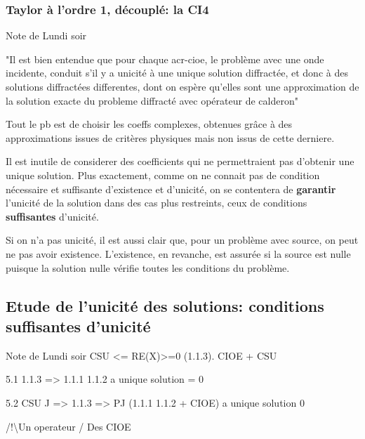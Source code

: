         \subsubsection{Taylor à l'ordre 1, découplé: la CI4}

        \begin{REM}
            Note de Lundi soir

            "Il est bien entendue que pour chaque \gls{acr-cioe}, le problème avec une onde incidente, conduit s'il y a unicité à une unique solution diffractée, et donc à des solutions diffractées differentes, dont on espère qu'elles sont une approximation de la solution exacte du probleme diffracté avec opérateur de calderon"

            Tout le pb est de choisir les coeffs complexes, obtenues grâce à des approximations issues de critères physiques mais non issus de cette derniere. 

            Il est inutile de considerer des coefficients qui ne permettraient pas d'obtenir une unique solution.
            Plus exactement, comme on ne connait pas de condition nécessaire et suffisante d'existence et d'unicité, on se contentera de {\bf garantir} l'unicité de la solution dans des cas plus restreints, ceux de conditions {\bf suffisantes} d'unicité. 
            
            Si on n'a pas unicité, il est aussi clair que, pour un problème avec source, on peut ne pas avoir existence.
            L'existence, en revanche, est assurée si la source est nulle puisque la solution nulle vérifie toutes les conditions du problème.
        \end{REM}

    \subsection{Etude de l'unicité des solutions: conditions suffisantes d'unicité}

        \begin{REM}
            Note de Lundi soir
            CSU <= RE(X)>=0 (1.1.3). CIOE + CSU

            5.1 1.1.3 => 1.1.1 1.1.2 a  unique solution = 0

            5.2 CSU J => 1.1.3 => PJ (1.1.1 1.1.2 + CIOE) a unique solution 0

            /!\textbackslash  Un operateur / Des CIOE
        \end{REM}


% 
